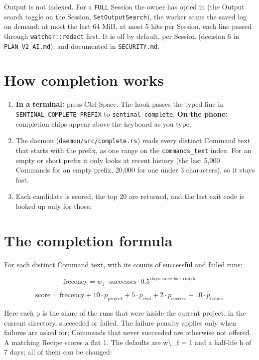 Output is not indexed. For a \texttt{FULL} Session the owner has opted in (the Output search toggle on the Session, \texttt{SetOutputSearch}), the worker scans the saved log on demand: at most the last 64 MiB, at most 5 hits per Session, each line passed through \texttt{watcher:\allowbreak{}:\allowbreak{}redact} first. It is off by default, per Session (decision 6 in \texttt{PLAN\_\allowbreak{}V2\_\allowbreak{}AI.\allowbreak{}md}), and documented in \texttt{SECURITY.\allowbreak{}md}.

\section{\texorpdfstring{How completion works}{How completion works}}

\begin{enumerate}
\item \textbf{In a terminal:} press Ctrl-Space. The hook passes the typed line in \texttt{SENTINAL\_\allowbreak{}COMPLETE\_\allowbreak{}PREFIX} to \texttt{sentinal\ complete}. \textbf{On the phone:} completion chips appear above the keyboard as you type.
\item The daemon (\texttt{daemon/\allowbreak{}src/\allowbreak{}complete.\allowbreak{}rs}) reads every distinct Command text that starts with the prefix, as one range on the \texttt{commands\_\allowbreak{}text} index. For an empty or short prefix it only looks at recent history (the last 5,000 Commands for an empty prefix, 20,000 for one under 3 characters), so it stays fast.
\item Each candidate is scored, the top 20 are returned, and the last exit code is looked up only for those.
\end{enumerate}

\section{\texorpdfstring{The completion formula}{The completion formula}}

For each distinct Command text, with its counts of successful and failed runs:

\[\text{frecency} = w_f \cdot \text{successes} \cdot 0.5^{\,\text{days since last run}/h}\]

\[\text{score} = \text{frecency} + 10 \cdot p_{\text{project}} + 5 \cdot p_{\text{cwd}} + 2 \cdot p_{\text{success}} - 10 \cdot p_{\text{failure}}\]

Here each p is the share of the runs that were inside the current project, in the current directory, succeeded or failed. The failure penalty applies only when failures are asked for; Commands that never succeeded are otherwise not offered. A matching Recipe scores a flat 1. The defaults are w\textbackslash{}\_f = 1 and a half-life h of 7 days; all of them can be changed:

